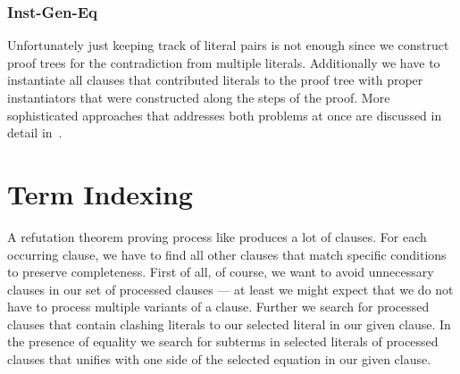 \subsubsection{Inst-Gen-Eq}

Unfortunately just keeping track of literal pairs is not enough since we construct proof trees for the contradiction from multiple literals.
Additionally we have to instantiate all clauses that contributed literals
to the proof tree with proper instantiators that were constructed along the steps of the proof.
More sophisticated approaches that addresses both problems at once are discussed in detail in~\cite{CS2011PhD}.
















\section{Term Indexing}\label{sec:term:indexing}








A refutation theorem proving process like \InstGenEQ{} produces a lot of clauses.
For each occurring clause, we have to find
all other clauses that match specific conditions to preserve completeness.
First of all, of course, we want to avoid unnecessary clauses in our set of processed clauses
--- at least we might expect that we do not have to process multiple variants of a clause.
Further we search for processed clauses that contain clashing literals to our selected literal in our given clause.
In the presence of equality we search for subterms in selected literals of processed clauses that unifies with one side of the selected equation in our given clause.


